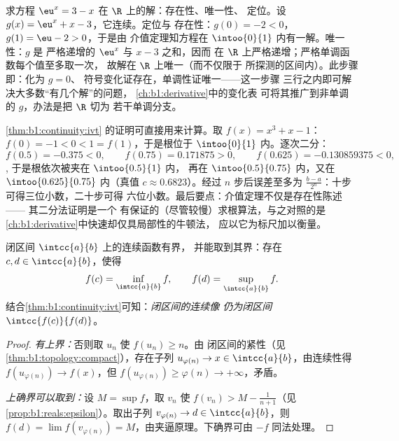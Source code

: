 \begin{example}[一个方程的完整步骤]\label{ex:b1:continuity:protocol}
求方程 $\eu^x = 3 - x$ 在 $\R$ 上的解：存在性、唯一性、
定位。设 $g(x) = \eu^x + x - 3$，它连续。定位与
存在性：$g(0) = -2 < 0$，$g(1) = \eu - 2 > 0$，于是由
介值定理知方程在
$\intoo{0}{1}$ 内有一解。唯一性：$g$ 是
严格递增的 $\eu^x$ 与 $x - 3$ 之和，因而
在 $\R$ 上严格递增；严格单调函数每个值至多取一次，
故解在 $\R$ 上唯一（而不仅限于
所探测的区间内）。此步骤即：化为 $g = 0$、
符号变化证存在，单调性证唯一——这一步骤
三行之内即可解决大多数“有几个解”的问题，
\cref{ch:b1:derivative}中的变化表
可将其推广到非单调的 $g$，办法是把 $\R$ 切为
若干单调分支。
\end{example}

\begin{example}[作为算法的二分法]\label{ex:b1:continuity:dichotomy}
\cref{thm:b1:continuity:ivt} 的证明可直接用来计算。取 $f(x) =
x^3 + x - 1$：$f(0) = -1 < 0 < 1 = f(1)$，于是根位于
$\intoo{0}{1}$ 内。逐次二分：
\[
f(0.5) = -0.375 < 0, \qquad
f(0.75) = 0.171875 > 0, \qquad
f(0.625) = -0.130859375 < 0 ,
\],
于是根依次被夹在 $\intoo{0.5}{1}$ 内，
再在 $\intoo{0.5}{0.75}$ 内，又在 $\intoo{0.625}{0.75}$ 内（真值
$c \approx 0.6823$）。经过 $n$ 步后误差至多为
$\frac{b - a}{2^n}$：十步可得三位小数，二十步可得
六位小数。最后要点：介值定理不仅是存在性陈述——
其二分法证明是一个
有保证的（尽管较慢）求根算法，与之对照的是
\cref{ch:b1:derivative}中快速却仅具局部性的牛顿法，
应以它为标尺加以衡量。
\end{example}

\begin{theorem}[最值定理]\label{thm:b1:continuity:evt}
闭区间 $\intcc{a}{b}$ 上的连续函数有界，
并能取到其界：存在 $c, d \in \intcc{a}{b}$，使得
\[
f(c) = \inf_{\intcc{a}{b}} f,
\qquad
f(d) = \sup_{\intcc{a}{b}} f .
\]
结合\cref{thm:b1:continuity:ivt}可知：\emph{闭区间的连续像
仍为闭区间} $\intcc{f(c)}{f(d)}$。
\end{theorem}

\begin{proof}
\emph{有上界：}否则取 $u_n$ 使 $f(u_n) \geq n$。由
闭区间的紧性（见\cref{thm:b1:topology:compact}），存在子列
$u_{\varphi(n)} \to x \in \intcc{a}{b}$，由连续性得
$f(u_{\varphi(n)}) \to f(x)$，但 $f(u_{\varphi(n)}) \geq \varphi(n)
\to +\infty$，矛盾。

\emph{上确界可以取到：}设 $M = \sup f$，取 $v_n$ 使 $f(v_n) >
M - \frac{1}{n+1}$（见\cref{prop:b1:reals:epsilon}）。取出子列
$v_{\varphi(n)} \to d \in \intcc{a}{b}$，则 $f(d) = \lim
f(v_{\varphi(n)}) = M$，由夹逼原理。下确界可由
$-f$ 同法处理。
\end{proof}

